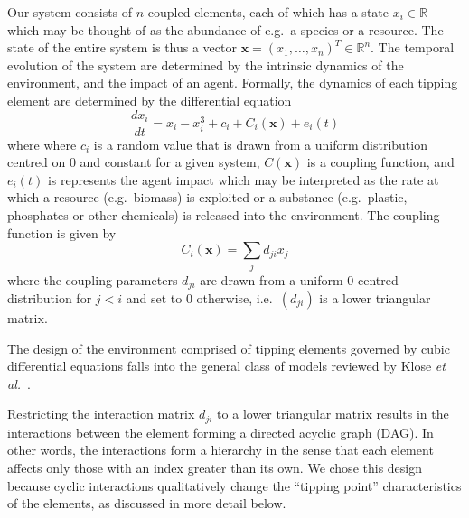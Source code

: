 \documentclass[conference]{IEEEtran}
\newcommand{\vectorsym}[1]{\ensuremath{\mathbf{#1}}}
\newcommand{\agentimpact}{\ensuremath{e}}
\newcommand{\couplingconstant}{\ensuremath{d}}
\newcommand{\couplingfunction}{\ensuremath{C}}
\begin{document}
Our system consists of $n$ coupled elements, each of which has a state
$x_i \in \mathbb{R}$ which may be thought of as the abundance of e.g.\
a species or a resource. The state of the entire system is thus a
vector $\vectorsym{x} = (x_1, \ldots, x_n)^T \in \mathbb{R}^n$. The
temporal evolution of the system are determined by the intrinsic
dynamics of the environment, and the impact of an agent. Formally, the
dynamics of each tipping element are determined by the differential
equation
\begin{equation}
  \label{eq_coupledwithagent}
  \frac{dx_i}{dt} = x_i - x_i^3 + c_i + \couplingfunction_i(\vectorsym{x}) + \agentimpact_i(t)
\end{equation}
where where $c_i$ is a random value that is drawn from a uniform
distribution centred on $0$ and constant for a given system,
$C(\vectorsym{x})$ is a coupling function, and $\agentimpact_i(t)$ is
represents the agent impact which may be interpreted as the rate at
which a resource (e.g.\ biomass) is exploited or a substance (e.g.\
plastic, phosphates or other chemicals) is released into the
environment. The coupling function is given by
\begin{equation}
  \label{eq_couplingfunction}
  \couplingfunction_i(\vectorsym{x}) = \sum_j \couplingconstant_{ji} x_j
\end{equation}
where the coupling parameters $\couplingconstant_{ji}$ are drawn from a uniform
$0$-centred distribution for $j < i$ and set to $0$ otherwise, i.e.\
$(\couplingconstant_{ji})$ is a lower triangular matrix.

The design of the environment comprised of tipping elements governed
by cubic differential equations falls into the general class of models
reviewed by Klose \textit{et al.}\
\cite{Klose2019_interactingtippingelements}.

Restricting the interaction matrix $\couplingconstant_{ji}$ to a lower triangular
matrix results in the interactions between the element forming a
directed acyclic graph (DAG). In other words, the interactions form a
hierarchy in the sense that each element affects only those with an
index greater than its own. We chose this design because cyclic
interactions qualitatively change the ``tipping point''
characteristics of the elements, as discussed in more detail below.


\end{document}
